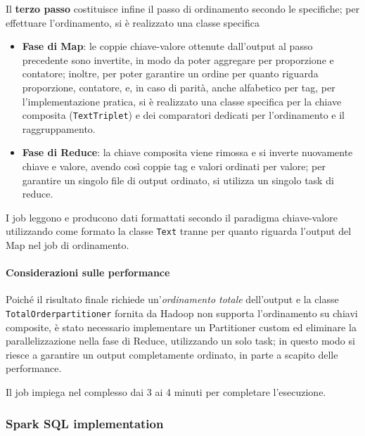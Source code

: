   Il \textbf{terzo passo} costituisce infine il passo di ordinamento secondo le specifiche; per effettuare l'ordinamento, si è realizzato una classe specifica
  \begin{itemize}
    \item
      \textbf{Fase di Map}:
      le coppie chiave-valore ottenute dall'output al passo precedente sono invertite, in modo da poter aggregare per proporzione e contatore;
      inoltre, per poter garantire un ordine per quanto riguarda proporzione, contatore, e, in caso di parità, anche alfabetico per tag,
      per l'implementazione pratica, si è realizzato una classe specifica per la chiave composita (\texttt{TextTriplet}) e dei comparatori dedicati per l'ordinamento e il raggruppamento.

    \item
      \textbf{Fase di Reduce}:
      la chiave composita viene rimossa e si inverte nuovamente chiave e valore, avendo così coppie tag e valori ordinati per valore;
      per garantire un singolo file di output ordinato, si utilizza un singolo task di reduce.
  \end{itemize}

  I job leggono e producono dati formattati secondo il paradigma chiave-valore utilizzando come formato la classe \texttt{Text} tranne per quanto riguarda l'output del Map nel job di ordinamento.

  \paragraph{Considerazioni sulle performance}\label{par:job1:mapreduce:performance}

  Poiché il risultato finale richiede un'\textit{ordinamento totale} dell'output e la classe \texttt{TotalOrderpartitioner} fornita da Hadoop non supporta l'ordinamento su chiavi composite,
  è stato necessario implementare un Partitioner custom ed eliminare la parallelizzazione nella fase di Reduce, utilizzando un solo task;
  in questo modo si riesce a garantire un output completamente ordinato, in parte a scapito delle performance.

  Il job impiega nel complesso dai 3 ai 4 minuti per completare l'esecuzione.

  \subsubsection{Spark SQL implementation}\label{subsub:job1:spark}

